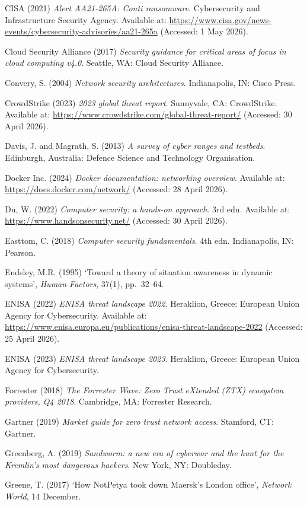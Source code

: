 CISA (2021) \textit{Alert AA21-265A: Conti ransomware}. Cybersecurity and Infrastructure Security Agency. Available at: \url{https://www.cisa.gov/news-events/cybersecurity-advisories/aa21-265a} (Accessed: 1 May 2026).

Cloud Security Alliance (2017) \textit{Security guidance for critical areas of focus in cloud computing v4.0}. Seattle, WA: Cloud Security Alliance.

Convery, S. (2004) \textit{Network security architectures}. Indianapolis, IN: Cisco Press.

CrowdStrike (2023) \textit{2023 global threat report}. Sunnyvale, CA: CrowdStrike. Available at: \url{https://www.crowdstrike.com/global-threat-report/} (Accessed: 30 April 2026).

Davis, J. and Magrath, S. (2013) \textit{A survey of cyber ranges and testbeds}. Edinburgh, Australia: Defence Science and Technology Organisation.

Docker Inc. (2024) \textit{Docker documentation: networking overview}. Available at: \url{https://docs.docker.com/network/} (Accessed: 28 April 2026).

Du, W. (2022) \textit{Computer security: a hands-on approach}. 3rd edn. Available at: \url{https://www.handsonsecurity.net/} (Accessed: 30 April 2026).

Easttom, C. (2018) \textit{Computer security fundamentals}. 4th edn. Indianapolis, IN: Pearson.

Endsley, M.R. (1995) `Toward a theory of situation awareness in dynamic systems', \textit{Human Factors}, 37(1), pp.~32--64.

ENISA (2022) \textit{ENISA threat landscape 2022}. Heraklion, Greece: European Union Agency for Cybersecurity. Available at: \url{https://www.enisa.europa.eu/publications/enisa-threat-landscape-2022} (Accessed: 25 April 2026).

ENISA (2023) \textit{ENISA threat landscape 2023}. Heraklion, Greece: European Union Agency for Cybersecurity.

Forrester (2018) \textit{The Forrester Wave: Zero Trust eXtended (ZTX) ecosystem providers, Q4 2018}. Cambridge, MA: Forrester Research.

Gartner (2019) \textit{Market guide for zero trust network access}. Stamford, CT: Gartner.

Greenberg, A. (2019) \textit{Sandworm: a new era of cyberwar and the hunt for the Kremlin's most dangerous hackers}. New York, NY: Doubleday.

Greene, T. (2017) `How NotPetya took down Maersk's London office', \textit{Network World}, 14 December.

